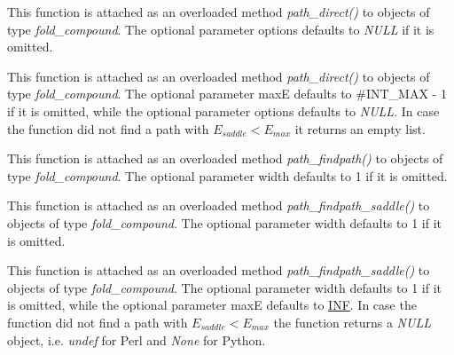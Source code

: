 \begin{DoxyRefList}
 This function is attached as an overloaded method {\itshape path\+\_\+direct()} to objects of type {\itshape fold\+\_\+compound}. The optional parameter {\ttfamily options} defaults to {\itshape N\+U\+LL} if it is omitted.  
\item[Global \mbox{\hyperlink{group__paths__direct_ga51d9edaeb42d1d178ea8ba46ccd4c8c0}{vrna\+\_\+path\+\_\+direct\+\_\+ub}} (vrna\+\_\+fold\+\_\+compound\+\_\+t $\ast$fc, const char $\ast$s1, const char $\ast$s2, int maxE, vrna\+\_\+path\+\_\+options\+\_\+t options)]\label{wrappers__wrappers000123}%
%
 This function is attached as an overloaded method {\itshape path\+\_\+direct()} to objects of type {\itshape fold\+\_\+compound}. The optional parameter {\ttfamily maxE} defaults to \#\+I\+N\+T\+\_\+\+M\+AX -\/ 1 if it is omitted, while the optional parameter {\ttfamily options} defaults to {\itshape N\+U\+LL}. In case the function did not find a path with $E_{saddle} < E_{max}$ it returns an empty list.  
\item[Global \mbox{\hyperlink{group__paths__direct_ga2fed8ff126f5becd82cedd81a25c9bf0}{vrna\+\_\+path\+\_\+findpath}} (vrna\+\_\+fold\+\_\+compound\+\_\+t $\ast$fc, const char $\ast$s1, const char $\ast$s2, int width)]\label{wrappers__wrappers000120}%
%
 This function is attached as an overloaded method {\itshape path\+\_\+findpath()} to objects of type {\itshape fold\+\_\+compound}. The optional parameter {\ttfamily width} defaults to 1 if it is omitted.  
\item[Global \mbox{\hyperlink{group__paths__direct_gad77dbfa125158f534147c0015a849bc3}{vrna\+\_\+path\+\_\+findpath\+\_\+saddle}} (vrna\+\_\+fold\+\_\+compound\+\_\+t $\ast$fc, const char $\ast$s1, const char $\ast$s2, int width)]\label{wrappers__wrappers000118}%
%
 This function is attached as an overloaded method {\itshape path\+\_\+findpath\+\_\+saddle()} to objects of type {\itshape fold\+\_\+compound}. The optional parameter {\ttfamily width} defaults to 1 if it is omitted.  
\item[Global \mbox{\hyperlink{group__paths__direct_gaca6d3ab6f8b9463e3382bd1f474c26f1}{vrna\+\_\+path\+\_\+findpath\+\_\+saddle\+\_\+ub}} (vrna\+\_\+fold\+\_\+compound\+\_\+t $\ast$fc, const char $\ast$s1, const char $\ast$s2, int width, int maxE)]\label{wrappers__wrappers000119}%
%
 This function is attached as an overloaded method {\itshape path\+\_\+findpath\+\_\+saddle()} to objects of type {\itshape fold\+\_\+compound}. The optional parameter {\ttfamily width} defaults to 1 if it is omitted, while the optional parameter {\ttfamily maxE} defaults to \mbox{\hyperlink{constants_8h_a12c2040f25d8e3a7b9e1c2024c618cb6}{I\+NF}}. In case the function did not find a path with $E_{saddle} < E_{max}$ the function returns a {\itshape N\+U\+LL} object, i.\+e. {\itshape undef} for Perl and {\itshape None} for Python.  

\end{DoxyRefList}

